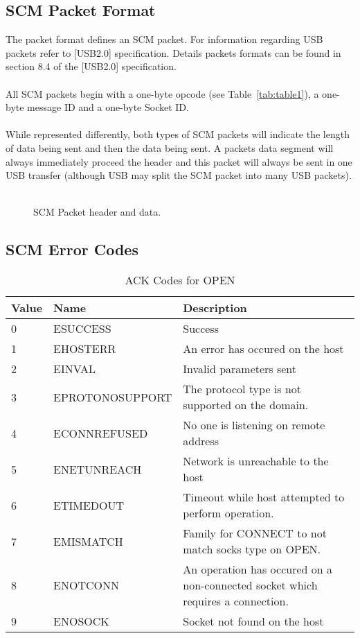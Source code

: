 \documentclass[10pt]{article}
\begin{document}
	\subsection{SCM Packet Format}
	The packet format defines an SCM packet. For information regarding USB packets refer to [USB2.0] specification. Details packets formats can be found in section 8.4 of the [USB2.0] specification. \\
	\\
	All SCM packets begin with a one-byte opcode (see Table~\ref{tab:table1}), a one-byte message ID and a one-byte Socket ID. \\
	\\
	While represented differently, both types of SCM packets will indicate the length of data being sent and then the data being sent. A packets data segment will always immediately proceed the header and this packet will always be sent in one USB transfer (although USB may split the SCM packet into many USB packets). \\
	\\
	\begin{figure}[H]
		\caption[SCM Packet header and data.]{SCM Packet header and data.}
			\centerline {
		} 
	\end{figure}
	\subsection{SCM Error Codes}
	\begin{table}[H]
		\begin{center}
			\caption{ACK Codes for OPEN}
			\label{tab:globalErrTable}
			\begin{tabular}{l|l|l} 
				\rowcolor{lightgray}
				\textbf{Value} &	\textbf{Name} & \textbf{Description}\\
				\hline
				0 & ESUCCESS & Success\\
				1 & EHOSTERR & An error has occured on the host\\
				2 & EINVAL & Invalid parameters sent\\
				3 & EPROTONOSUPPORT & The protocol type is not supported on the domain. \\
				4 & ECONNREFUSED & No one is listening on remote address\\
				5 & ENETUNREACH & Network is unreachable to the host\\
				6 & ETIMEDOUT & Timeout while host attempted to perform operation.\\
				7 & EMISMATCH & Family for CONNECT to not match socks type on OPEN.\\
				8 & ENOTCONN & An operation has occured on a non-connected socket which requires a connection.\\
				9 & ENOSOCK & Socket not found on the host \\
			\end{tabular}
		\end{center}
	\end{table} \mbox{}\\
\end{document}
